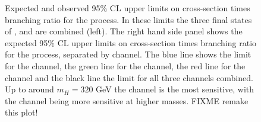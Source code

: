 \begin{figure}[h!]
\begin{center}
\caption{Expected and observed 95\% CL upper limits on cross-section times branching ratio
for the \Htohhtobbtautau process. In these limits the three final states of \etau, \mutau and \tautau are combined \cite{CMS-HIG-14-034} (left).
The right hand side panel shows the expected 95\% CL upper limits on cross-section times branching ratio for the \Htohhtobbtautau
process, separated by channel. The blue line shows the limit for the \tautau channel, the green line for the \mutau channel, the red line
for the \etau channel and the black line the limit for all three channels combined. Up to around $m_H = 320$ GeV the \mutau channel is the most
sensitive, with the \tautau channel being more sensitive at higher masses. FIXME remake this plot!}
\label{fig:hhh_results_modelindep}
\end{center}
\end{figure}



